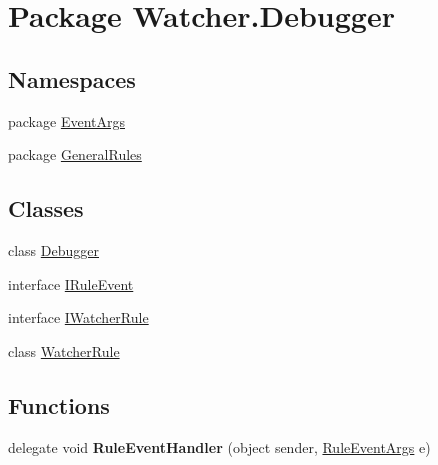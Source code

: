 \hypertarget{namespace_watcher_1_1_debugger}{\section{Package Watcher.\+Debugger}
\label{namespace_watcher_1_1_debugger}
}
\subsection*{Namespaces}
\begin{DoxyCompactItemize}
\item 
package \hyperlink{namespace_watcher_1_1_debugger_1_1_event_args}{Event\+Args}
\item 
package \hyperlink{namespace_watcher_1_1_debugger_1_1_general_rules}{General\+Rules}
\end{DoxyCompactItemize}
\subsection*{Classes}
\begin{DoxyCompactItemize}
\item 
class \hyperlink{class_watcher_1_1_debugger_1_1_debugger}{Debugger}
\item 
interface \hyperlink{interface_watcher_1_1_debugger_1_1_i_rule_event}{I\+Rule\+Event}
\item 
interface \hyperlink{interface_watcher_1_1_debugger_1_1_i_watcher_rule}{I\+Watcher\+Rule}
\item 
class \hyperlink{class_watcher_1_1_debugger_1_1_watcher_rule}{Watcher\+Rule}
\end{DoxyCompactItemize}
\subsection*{Functions}
\begin{DoxyCompactItemize}
\item 
\hypertarget{namespace_watcher_1_1_debugger_a9d5fd5753d3a110754eab2aba9a899d1}{delegate void {\bfseries Rule\+Event\+Handler} (object sender, \hyperlink{class_watcher_1_1_debugger_1_1_event_args_1_1_rule_event_args}{Rule\+Event\+Args} e)}\label{namespace_watcher_1_1_debugger_a9d5fd5753d3a110754eab2aba9a899d1}

\end{DoxyCompactItemize}
